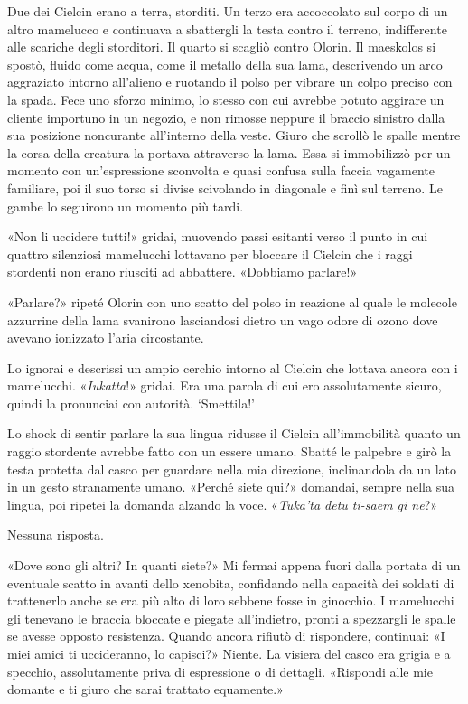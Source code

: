 Due dei Cielcin erano a terra, storditi. Un terzo era accoccolato sul
corpo di un altro mamelucco e continuava a sbattergli la testa contro il
terreno, indifferente alle scariche degli storditori. Il quarto si
scagliò contro Olorin. Il maeskolos si spostò, fluido come acqua, come
il metallo della sua lama, descrivendo un arco aggraziato intorno
all'alieno e ruotando il polso per vibrare un colpo preciso con la
spada. Fece uno sforzo minimo, lo stesso con cui avrebbe potuto aggirare
un cliente importuno in un negozio, e non rimosse neppure il braccio
sinistro dalla sua posizione noncurante all'interno della veste. Giuro
che scrollò le spalle mentre la corsa della creatura la portava
attraverso la lama. Essa si immobilizzò per un momento con
un'espressione sconvolta e quasi confusa sulla faccia vagamente
familiare, poi il suo torso si divise scivolando in diagonale e finì sul
terreno. Le gambe lo seguirono un momento più tardi.

«Non li uccidere tutti!» gridai, muovendo passi esitanti verso il punto
in cui quattro silenziosi mamelucchi lottavano per bloccare il Cielcin
che i raggi stordenti non erano riusciti ad abbattere. «Dobbiamo
parlare!»

«Parlare?» ripeté Olorin con uno scatto del polso in reazione al quale
le molecole azzurrine della lama svanirono lasciandosi dietro un vago
odore di ozono dove avevano ionizzato l'aria circostante.

Lo ignorai e descrissi un ampio cerchio intorno al Cielcin che lottava
ancora con i mamelucchi. «\emph{Iukatta}!» gridai. Era una parola di cui
ero assolutamente sicuro, quindi la pronunciai con autorità. `Smettila!'

Lo shock di sentir parlare la sua lingua ridusse il Cielcin
all'immobilità quanto un raggio stordente avrebbe fatto con un essere
umano. Sbatté le palpebre e girò la testa protetta dal casco per
guardare nella mia direzione, inclinandola da un lato in un gesto
stranamente umano. «Perché siete qui?» domandai, sempre nella sua
lingua, poi ripetei la domanda alzando la voce. «\emph{Tuka'ta detu
	ti-saem gi ne}?»

Nessuna risposta.

«Dove sono gli altri? In quanti siete?» Mi fermai appena fuori dalla
portata di un eventuale scatto in avanti dello xenobita, confidando
nella capacità dei soldati di trattenerlo anche se era più alto di loro
sebbene fosse in ginocchio. I mamelucchi gli tenevano le braccia
bloccate e piegate all'indietro, pronti a spezzargli le spalle se avesse
opposto resistenza. Quando ancora rifiutò di rispondere, continuai: «I
miei amici ti uccideranno, lo capisci?» Niente. La visiera del casco era
grigia e a specchio, assolutamente priva di espressione o di dettagli.
«Rispondi alle mie domante e ti giuro che sarai trattato equamente.»

